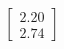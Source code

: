 \documentclass[preview]{standalone}
\begin{document}
\begin{align*}
\begin{bmatrix} 2.20 \\ 2.74 \end{bmatrix}
\end{align*}
\end{document}
